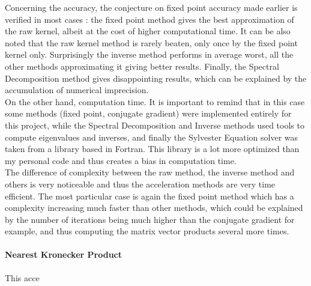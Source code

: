 \documentclass{article}
\theoremstyle{definition}
\begin{document}
Concerning the accuracy, the conjecture on fixed point accuracy made earlier is verified in most cases : the fixed point method gives the best approximation of the raw kernel, albeit at the cost of higher computational time. It can be also noted that the raw kernel method is rarely beaten, only once by the fixed point kernel only. Surprisingly the inverse method performs in average worst, all the other methods approximating it giving better results. Finally, the Spectral Decomposition method gives disappointing results, which can be explained by the accumulation of numerical imprecision.\\
On the other hand, computation time. It is important to remind that in this case some methods (fixed point, conjugate gradient) were implemented entirely for this project, while the Spectral Decomposition and Inverse methods used tools to compute eigenvalues and inverses, and finally the Sylvester Equation solver was taken from a library based in Fortran. This library is a lot more optimized than my personal code and thus creates a bias in computation time.\\
The difference of complexity between the raw method, the inverse method and others is very noticeable and thus the acceleration methods are very time efficient. The most particular case is again the fixed point method which has a complexity increasing much faster than other methods, which could be explained by the number of iterations being much higher than the conjugate gradient for example, and thus computing the matrix vector products several more times.
\paragraph{Nearest Kronecker Product}
This acce
\end{document}
